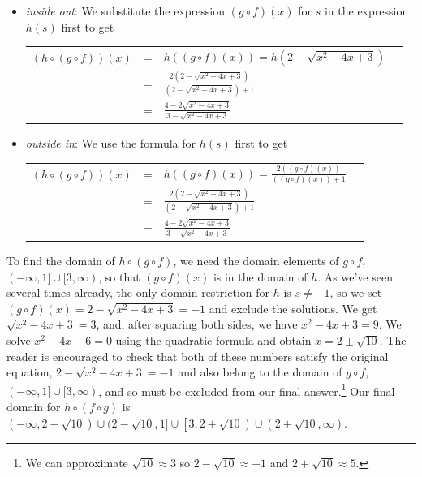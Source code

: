 \documentclass{ximera}
\begin{document}
\begin{example}
\begin{explanation}
\begin{enumerate}
\begin{itemize}

\item  \textit{inside out}: We substitute the expression $(g \circ f)(x)$ for $s$ in the expression $h(s)$ first to get
\begin{longtable}{rclr} $(h \circ (g \circ f))(x)$ & = & $h((g \circ f)(x))=h\left(2 - \sqrt{x^2-4x+3}\right)$  & \\
 & = & $\frac{2 \left(2 - \sqrt{x^2-4x+3}\right)}{\left(2 - \sqrt{x^2-4x+3}\right)+1}$ & \\  
 & = & $\frac{4 - 2\sqrt{x^2-4x+3}}{3 - \sqrt{x^2-4x+3}}$ & \\
 \end{longtable}

\item  \textit{outside in}:  We use the formula for $h(s)$ first to get
\begin{longtable}{rclr} $(h \circ (g \circ f))(x)$ & = & $h((g \circ f)(x))=\frac{2 \left( (g \circ f)(x)\right)}{  \left( (g \circ f)(x)\right) + 1}$  & \\
& = & $\frac{2 \left(2 - \sqrt{x^2-4x+3}\right)}{\left(2 - \sqrt{x^2-4x+3}\right)+1}$ & \\  
 & = & $\frac{4 - 2\sqrt{x^2-4x+3}}{3 - \sqrt{x^2-4x+3}}$ & \\
 \end{longtable}
 
 \end{itemize}
 
To find the domain of $h \circ (g \circ f)$, we need the domain elements of $g \circ f$, $(-\infty, 1] \cup [3,\infty)$, so that $(g \circ f)(x)$ is in the domain of $h$.  As we've seen several times already, the only domain restriction for $h$ is $s \neq -1$, so we set  $(g \circ f)(x) = 2 - \sqrt{x^2-4x+3} = -1$ and exclude the solutions.     We get $\sqrt{x^2-4x+3} = 3$, and, after squaring both sides, we have $x^2-4x+3 = 9$.  We solve $x^2-4x-6 = 0$ using the quadratic formula and obtain $x = 2 \pm \sqrt{10}$.  The reader is encouraged to check that both of these numbers satisfy the original equation, $2 - \sqrt{x^2-4x+3} = -1$ and also belong to the domain of $g \circ f$, $(-\infty, 1] \cup [3,\infty)$, and so must be excluded from our final answer.\footnote{We can approximate $\sqrt{10} \approx 3$ so $2-\sqrt{10} \approx -1$ and $2+\sqrt{10} \approx 5$.}   Our final domain for $h \circ (f \circ g)$ is $(-\infty, 2 -\sqrt{10}) \cup (2 - \sqrt{10}, 1] \cup \left[3, 2 + \sqrt{10}\right) \cup \left(2+\sqrt{10}, \infty\right)$.


\end{enumerate}
\end{explanation}
\end{example}
\end{document}

